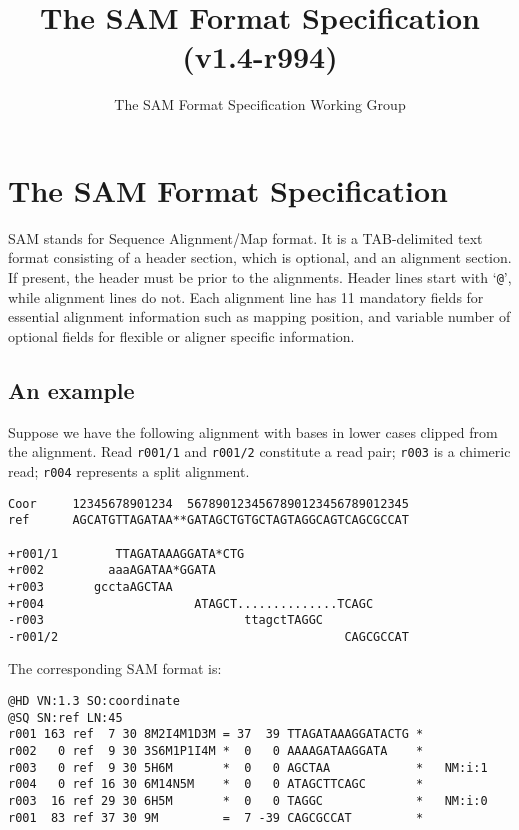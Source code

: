 \documentclass[10pt]{article}
\title{The SAM Format Specification (v1.4-r994)}
\author{The SAM Format Specification Working Group}
\begin{document}
\maketitle


\section{The SAM Format Specification}
SAM stands for Sequence Alignment/Map format. It is a TAB-delimited text
format consisting of a header section, which is optional, and an
alignment section. If present, the header must be prior to the
alignments. Header lines start with `{\tt @}', while alignment lines do
not. Each alignment line has 11 mandatory fields for essential alignment
information such as mapping position, and variable number of optional
fields for flexible or aligner specific information.

\subsection{An example}\label{sec:example}
Suppose we have the following alignment with bases in lower cases
clipped from the alignment. Read {\tt r001/1} and {\tt r001/2}
constitute a read pair; {\tt r003} is a chimeric read; {\tt r004}
represents a split alignment.

\begin{framed}\small
\begin{verbatim}
Coor     12345678901234  5678901234567890123456789012345
ref      AGCATGTTAGATAA**GATAGCTGTGCTAGTAGGCAGTCAGCGCCAT

+r001/1        TTAGATAAAGGATA*CTG
+r002         aaaAGATAA*GGATA
+r003       gcctaAGCTAA
+r004                     ATAGCT..............TCAGC
-r003                            ttagctTAGGC
-r001/2                                        CAGCGCCAT
\end{verbatim}
\end{framed}
The corresponding SAM format is:
\begin{framed}\small
\begin{verbatim}
@HD VN:1.3 SO:coordinate
@SQ SN:ref LN:45
r001 163 ref  7 30 8M2I4M1D3M = 37  39 TTAGATAAAGGATACTG *
r002   0 ref  9 30 3S6M1P1I4M *  0   0 AAAAGATAAGGATA    *
r003   0 ref  9 30 5H6M       *  0   0 AGCTAA            *   NM:i:1
r004   0 ref 16 30 6M14N5M    *  0   0 ATAGCTTCAGC       *
r003  16 ref 29 30 6H5M       *  0   0 TAGGC             *   NM:i:0
r001  83 ref 37 30 9M         =  7 -39 CAGCGCCAT         *
\end{verbatim}
\end{framed}
\end{document}
